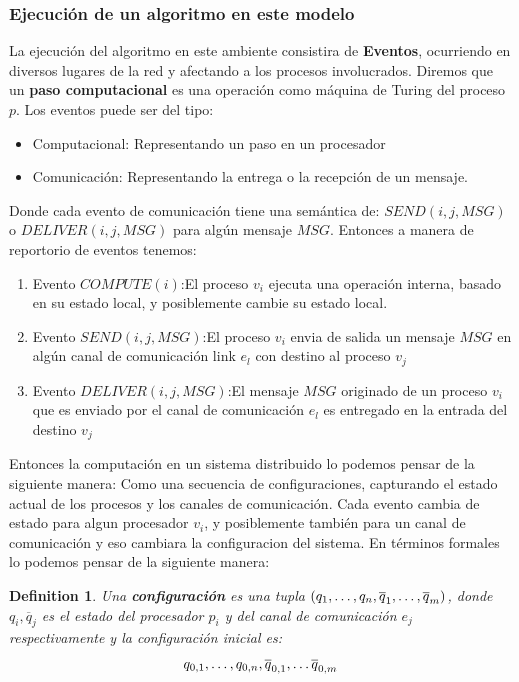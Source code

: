 \documentclass[10pt]{report}
\newtheorem{definition}{Definition}
\begin{document}
{    \subsubsection{Ejecución de un algoritmo en este modelo}
    La ejecución del algoritmo en este ambiente consistira de \textbf{Eventos}, ocurriendo en diversos
    lugares de la red y afectando a los procesos involucrados.
    Diremos que un \textbf{paso computacional} es una operación como máquina de Turing del proceso $p$.
    Los eventos puede ser del tipo:
    \begin{itemize}
        \item Computacional: Representando un paso en un procesador
        \item Comunicación: Representando la entrega o la recepción de un mensaje.
    \end{itemize}
    Donde cada evento de comunicación tiene una semántica de:\newline
    $SEND(i,j,MSG)$ o $DELIVER(i,j,MSG)$ para algún mensaje $MSG$.
    Entonces a manera de reportorio de eventos tenemos:
    \begin{enumerate}
        \item Evento $COMPUTE(i)$:\space El proceso $v_{i}$ ejecuta una operación interna, basado en su estado local, y
        posiblemente cambie su estado local.
        \item Evento $SEND(i,j,MSG)$:\space El proceso $v_{i}$ envia de salida un mensaje $MSG$ en algún canal de
        comunicación link $e_{l}$ con destino al proceso $v_{j}$
        \item Evento $DELIVER(i,j,MSG)$:\space El mensaje $MSG $ originado de un proceso $v_{i}$
        que es enviado por el canal de comunicación $e_{l}$ es entregado en la entrada del destino $v_{j}$
    \end{enumerate}
    Entonces la computación en un sistema distribuido lo podemos pensar de la siguiente manera: \newline
    Como una secuencia de configuraciones, capturando el estado actual de los procesos y los canales de comunicación.\newline
    Cada evento cambia de estado para algun procesador $v_{i}$, y posiblemente también para un canal de comunicación
    y eso cambiara la configuracion del sistema.
    En términos formales lo podemos pensar de la siguiente manera:
    \theoremstyle{definition}
    \begin{definition}
        Una \textbf{configuración} es una tupla $(q_{1},\mathellipsis,q_{n},\overline{q}_{1},\mathellipsis,\overline{q}_{m})$,
        donde $q_{i},\overline{q}_{j}$ es el estado del procesador $p_{i}$ y del canal de comunicación $e_{j}$ respectivamente
        y la configuración inicial es:
        \begin{equation}
        q_{0,1},\mathellipsis,q_{0,n},\overline{q}_{0,1},\mathellipsis \overline{q}_{0,m}\label{eq:equation5}
        \end{equation}


\end{definition}}
\end{document}
